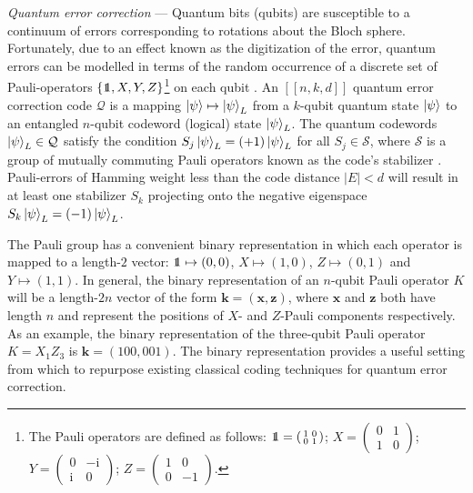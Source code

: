\documentclass[%
 reprint,
superscriptaddress,
nofootinbib,
 amsmath,amssymb,
secnumarabic
]{revtex4-1}
\DeclareRobustCommand\openone{\leavevmode\hbox{\small1\normalsize\kern-.33em1}}
\begin{document}
\textit{Quantum error correction} --- Quantum bits (qubits) are susceptible to a continuum of errors corresponding to rotations about the Bloch sphere. Fortunately, due to an effect known as the digitization of the error, quantum errors can be modelled in terms of the random occurrence of a discrete set of Pauli-operators $\{\openone,X,Y,Z\}$\footnote{The Pauli operators are defined as follows: $\openone=\left(\begin{smallmatrix}1&0\\0&1\end{smallmatrix}\right)$; $X=\left(\begin{smallmatrix}0&1\\1&0\end{smallmatrix}\right)$; $Y=\left(\begin{smallmatrix}0&-\text{i}\\ \text{i}&0\end{smallmatrix}\right)$; $Z=\left(\begin{smallmatrix}1&0\\0&-1\end{smallmatrix}\right)$.} on each qubit \cite{Knill97}. An $[[n,k,d]]$ quantum error correction code $\mathcal{Q}$ is a mapping $\ket{\psi}\mapsto \ket{\psi}_L$ from a $k$-qubit quantum state $\ket{\psi}$ to an entangled $n$-qubit codeword (logical) state $\ket{\psi}_L$. The quantum codewords $\ket{\psi}_L\in \mathcal{Q}$ satisfy the condition $S_j\ket{\psi}_L=(+1)\ket{\psi}_L$ for all $S_j\in\mathcal{S}$, where $\mathcal{S}$ is a group of mutually commuting Pauli operators known as the code's stabilizer \cite{Gottesman97}. Pauli-errors of Hamming weight less than the code distance $|E|<d$ will result in at least one stabilizer $S_k$ projecting onto the negative eigenspace $S_k\ket{\psi}_L=(-1)\ket{\psi}_L$. 

The Pauli group has a convenient binary representation in which each operator is mapped to a length-$2$ vector: $\openone\mapsto (0 , 0)$, $X\mapsto (1,0)$, $Z\mapsto(0,1)$ and $Y\mapsto(1,1)$. In general, the binary representation of an $n$-qubit Pauli operator $K$ will be a length-$2n$ vector of the form $\mathbf{k} = (\mathbf{x},\mathbf{z})$, where $\mathbf{x}$ and $\mathbf{z}$ both have length $n$ and represent the positions of $X$- and $Z$-Pauli components respectively. As an example, the binary representation of the three-qubit Pauli operator $K=X_1Z_3$ is $\mathbf{k}=(100,001)$. The binary representation provides a useful setting from which to repurpose existing classical coding techniques for quantum error correction.
\end{document}
